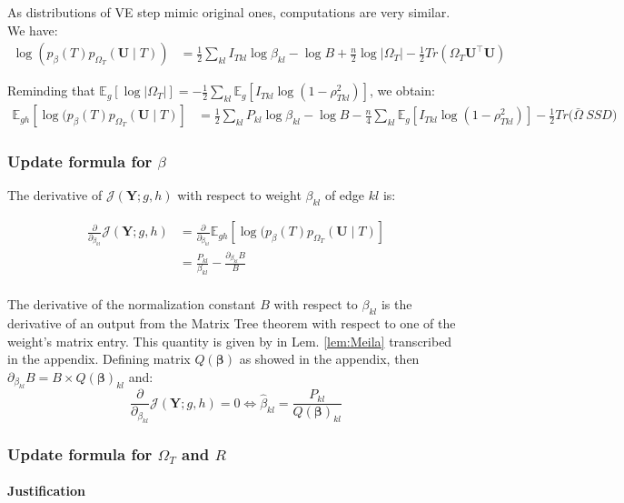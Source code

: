 \documentclass[11pt,a4paper]{article}
\newcommand{\betabf}{\boldsymbol{\beta}}
\newcommand{\Ybf}{\boldsymbol{Y}}
\newcommand{\Ubf}{\boldsymbol{U}}
\newcommand{\Esp}{\mathds{E}}
\begin{document}
As distributions of VE step mimic original ones, computations are very similar. We have:
\begin{align*}
\log (p_\beta(T)p_{\Omega_T}(\Ubf\mid T))  &= \frac{1}{2}\sum_{kl} I_{Tkl} \log \beta_{kl} - \log B + \frac{n}{2}\log |\Omega_T| - \frac{1}{2}Tr(\Omega_T \Ubf^\intercal \Ubf) 
\end{align*}

Reminding that $ \Esp_g[\log|\Omega_T|]=-\frac{1}{2}\sum_{kl} \Esp_g[ I_{Tkl}\log(1-\rho_{Tkl}^2)]$,  we obtain:
\begin{align*}
\Esp_{gh} [\log (p_\beta(T)p_{\Omega_T}(\Ubf\mid T) ] &=\frac{1}{2}\sum_{kl} P_{kl} \log  \beta_{kl} - \log B - \frac{n}{4} \sum_{kl} \Esp_g[ I_{Tkl}\log(1-\rho_{Tkl}^2)]  - \frac{1}{2}Tr\big(\bar{\Omega}\: SSD\big) 
\end{align*}
 
 \subsubsection{Update formula for $\beta$}
 The derivative of $ \mathcal{J}(\Ybf ; g,h)$ with respect to weight $\beta_{kl}$ of edge $kl$ is:
 
 \begin{align*}
\frac{\partial}{\partial_{\beta_{kl}}} \mathcal{J}(\Ybf ; g,h) &=  \frac{\partial}{\partial_{\beta_{kl}}} \Esp_{gh} [\log (p_\beta(T)p_{\Omega_T}(\Ubf\mid T) ] \\
&= \frac{P_{kl}}{\beta_{kl}} - \frac{\partial_{\beta_{kl}} B }{B} \\
\end{align*}

The derivative of the normalization constant $B$ with respect to $\beta_{kl}$ is the derivative of an output from the Matrix Tree theorem with respect to one of the weight's matrix entry. This quantity is given by \citet{Meila} in Lem. \ref{lem:Meila} transcribed in the appendix. Defining matrix $Q(\betabf)$ as showed in the appendix, then $\partial_{\beta_{kl}} B = B\times Q(\betabf)_{kl}$ and:
$$\frac{\partial}{\partial_{\beta_{kl}}} \mathcal{J}(\Ybf ; g,h) 
=0 \iff  \boxed{\widehat{\beta}_{kl} = \frac{P_{kl}}{ Q(\betabf)_{kl}} }$$

 \subsubsection{Update formula for $\Omega_T$ and $R$}
\paragraph{Justification\\}
\end{document}
